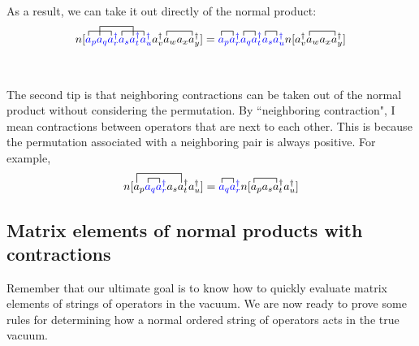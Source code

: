 \documentclass{article}
\newcommand{\dg}{\ensuremath{^\dagger} }
\begin{document}
As a result, we can take it out directly of the normal product: 
\[\contraction{n[}{a}{{}_p a_q}{a}
\contraction[2ex]{n[a_p }{a}{{}_q a_r\dg a_s }{a}
\contraction{n[a_p a_q a_r\dg }{a}{{}_s a_t\dg }{a}
\contraction{n[a_p a_q a_r\dg a_s a_t\dg a_u\dg a_v\dg}{a}{{}_w a_x}{a}
n[{\color{blue} a_p a_q a_r\dg a_s a_t\dg a_u\dg} a_v\dg a_w a_x a_y\dg] =  
\contraction{}{a}{{}_p}{a}
\contraction{a_p a_r\dg }{a}{{}_q }{a}
\contraction{a_p a_r\dg a_q a_t\dg  }{a}{{}_s}{a}
\contraction{a_p a_r\dg a_q a_t\dg a_s  a_u\dg n[a_v\dg}{a}{{}_w a_x}{a}
{\color{blue} a_p a_r\dg a_q a_t\dg a_s  a_u\dg }n[a_v\dg a_w a_x a_y\dg]\]
\\ \\
The second tip is that neighboring contractions can be taken out of the normal product without considering the permutation.
By ``neighboring contraction", I mean contractions between operators that are next to each other.
This is because the permutation associated with a neighboring pair is always positive. 
For example,
\[
\contraction[2ex]{n[}{a}{{}_p{\color{blue} a_q a_r\dg } a_s}{a}
\contraction{n[a_p }{a}{{}_q}{a}
n[a_p {\color{blue} a_q a_r\dg } a_s a_t\dg a_u\dg] = 
\contraction{}{a}{{}_q}{a}
\contraction{{\color{blue} a_q a_r\dg }  n[}{a}{{}_p a_s}{a}
{\color{blue} a_q a_r\dg }  n[a_p a_s a_t\dg a_u\dg] \]
\subsection{Matrix elements of normal products with contractions}
Remember that our ultimate goal is to know how to quickly evaluate matrix elements of strings of operators in the vacuum. 
We are now ready to prove some rules for determining how a normal ordered string of operators acts in the true vacuum.
\end{document}
